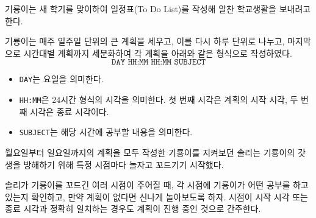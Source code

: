기룡이는 새 학기를 맞이하여 일정표(To Do List)를 작성해 알찬 학교생활을 보내려고 한다.

기룡이는 매주 일주일 단위의 큰 계획을 세우고, 이를 다시 하루 단위로 나누고, 마지막으로 시간대별 계획까지 세분화하여 각 계획을 아래와 같은 형식으로 작성하였다.
$$\texttt{DAY HH:MM HH:MM SUBJECT}$$

\begin{itemize}
\item \texttt{DAY}는 요일을 의미한다.
\item \texttt{HH:MM}은 24시간 형식의 시각을 의미한다. 첫 번째 시각은 계획의 시작 시각, 두 번째 시각은 종료 시각이다. 
\item \texttt{SUBJECT}는 해당 시간에 공부할 내용을 의미한다.
\end{itemize}

월요일부터 일요일까지의 계획을 모두 작성한 기룡이를 지켜보던 솔리는 기룡이의 갓생을 방해하기 위해 특정 시점마다 놀자고 꼬드기기 시작했다. 

솔리가 기룡이를 꼬드긴 여러 시점이 주어질 때, 각 시점에 기룡이가 어떤 공부를 하고 있는지 확인하고, 만약 계획이 없다면 신나게 놀아보도록 하자. 시점이 시작 시각 또는 종료 시각과 정확히 일치하는 경우도 계획이 진행 중인 것으로 간주한다.